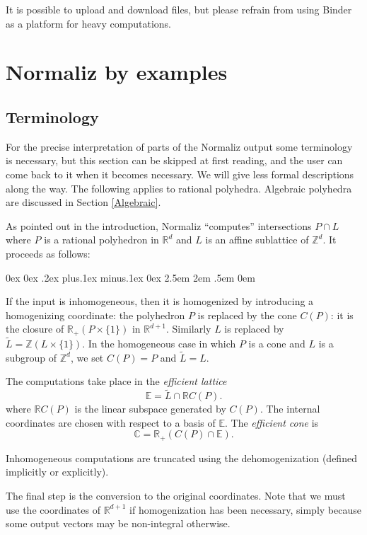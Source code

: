\documentclass[12pt,a4paper]{scrartcl}
\newcounter{listi}
\newcommand{\stdli}{ \topsep0ex \partopsep0ex %
\parsep.2ex plus.1ex minus.1ex \itemsep0ex%
\leftmargin2.5em \labelwidth2em \labelsep.5em \rightmargin0em}%
\newenvironment{arab}{\begin{list}{\textup{(\arabic{listi})}}%
	{\usecounter{listi}\stdli}}{\end{list}}
\theoremstyle{definition}
\def\CC{{\mathbb C}}
\def\ZZ{{\mathbb Z}}
\def\RR{{\mathbb R}}
\def\EE{{\mathbb E}}
\begin{document}
It is possible to upload and download files, but please refrain from using Binder as a platform for heavy computations.



\section{Normaliz by examples}\label{Examples}

\subsection{Terminology}\label{Term}

For the precise interpretation of parts of the Normaliz output some terminology is necessary, but this section can be skipped at first reading, and the user can come back to it when it becomes necessary. We will give less formal descriptions along the way. The following applies to rational polyhedra. Algebraic polyhedra are discussed in Section \ref{Algebraic}.

As pointed out in the introduction, Normaliz ``computes'' intersections $P\cap L$ where $P$ is a rational polyhedron in $\RR^d$ and $L$ is an affine sublattice of $\ZZ^d$. It proceeds as follows:

\begin{arab}
	\item If the input is inhomogeneous, then it is homogenized by introducing a homogenizing coordinate: the polyhedron $P$ is replaced by the cone $C(P)$: it is the closure of $\RR_+(P\times \{1\})$ in $\RR^{d+1}$. Similarly $L$ is replaced by $\widetilde L=\ZZ(L\times \{1\})$. In the homogeneous case in which $P$ is a cone and $L$ is a subgroup of $\ZZ^d$, we set $C(P)=P$ and $\widetilde L=L$.
	
	\item The computations take place in the \emph{efficient lattice} 
	$$
	\EE=\widetilde{L}\cap \RR C(P).
	$$
	where $\RR C(P)$ is the linear subspace generated by $C(P)$. The internal coordinates are chosen with respect to a basis of $\EE$. The \emph{efficient cone} is
	$$
	\CC=\RR_+(C(P)\cap \EE).
	$$
	
	\item Inhomogeneous computations are truncated using the dehomogenization (defined implicitly or explicitly).
	
	\item The final step is the conversion to the original coordinates. Note that we must use the coordinates of $\RR^{d+1}$ if homogenization has been necessary, simply because some output vectors may be non-integral otherwise.
\end{arab}
\end{document}
